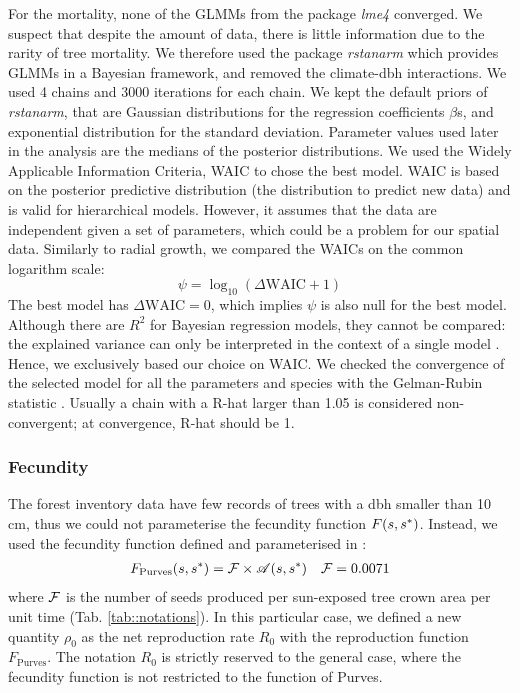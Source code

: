 For the mortality, none of the GLMMs from the package \textit{lme4} converged. We suspect that despite the amount of data, there is little information due to the rarity of tree mortality. We therefore used the package \textit{rstanarm} \citep{rstanarm} which provides GLMMs in a Bayesian framework, and removed the climate-dbh interactions. We used 4 chains and 3000 iterations for each chain. We kept the default priors of \textit{rstanarm}, that are Gaussian distributions for the regression coefficients $ \beta $s, and exponential distribution for the standard deviation. Parameter values used later in the analysis are the medians of the posterior distributions. We used the Widely Applicable Information Criteria, WAIC \citep[and reference therein]{Hooten2015} to chose the best model. WAIC is based on the posterior predictive distribution (the distribution to predict new data) and is valid for hierarchical models. However, it assumes that the data are independent given a set of parameters, which could be a problem for our spatial data. Similarly to radial growth, we compared the WAICs on the common logarithm scale:
\begin{equation} \label{eq::psi}
	\psi = \log_{10}(\Delta \text{WAIC} + 1)
\end{equation}
The best model has $ \Delta \text{WAIC} = 0 $, which implies $ \psi $ is also null for the best model. Although there are $ R^2 $ for Bayesian regression models, they cannot be compared: the explained variance can only be interpreted in the context of a single model \citep{Gelman2018}. Hence, we exclusively based our choice on WAIC. We checked the convergence of the selected model for all the parameters and species with the Gelman-Rubin statistic \citep[R-hat diagnostic]{Gelman1992}. Usually a chain with a R-hat larger than 1.05 is considered non-convergent; at convergence, R-hat should be 1.

\subsubsection{Fecundity}
The forest inventory data have few records of trees with a dbh smaller than 10 cm, thus we could not parameterise the fecundity function $ F(s, {s}^{*}) $. Instead, we used the fecundity function defined and parameterised in \citet{Purves2008}:
\begin{align} \label{eq::fecundity_fct}
	F_{\text{Purves}}(s, {s}^{*}) = \mathcal{F} \times \mathscr{A}(s, {s}^{*}) && \mathcal{F} = 0.0071
\end{align}
where $ \mathcal{F} $ is the number of seeds produced per sun-exposed tree crown area per unit time (Tab. \ref{tab::notations}). In this particular case, we defined a new quantity $ \rho_0 $ as the net reproduction rate $ R_0 $ with the reproduction function $ F_{\text{Purves}} $. The notation $ R_0 $ is strictly reserved to the general case, where the fecundity function is not restricted to the function of Purves.

